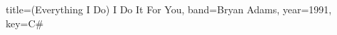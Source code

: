 \documentclass{bekki-leadsheet}
\begin{document}
\begin{song}{title={(Everything I Do) I Do It For You}, band={Bryan Adams}, year={1991}, key={C#}}



\end{song}
\end{document}
